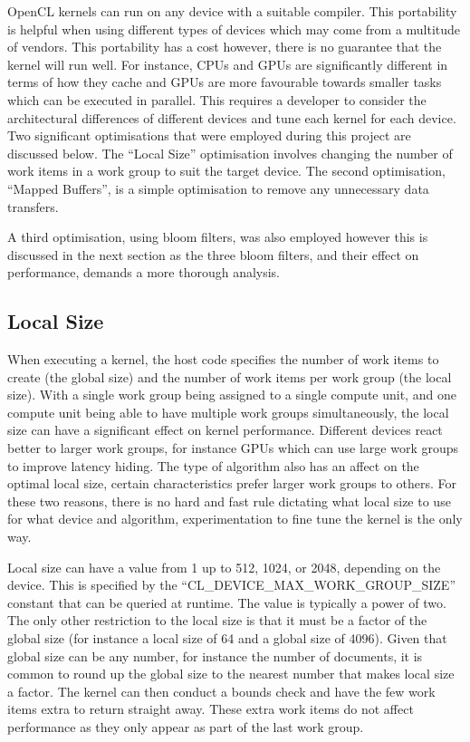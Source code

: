 OpenCL kernels can run on any device with a suitable compiler. This portability
is helpful when using different types of devices which may come from a multitude
of vendors. This portability has a cost however, there is no guarantee that the
kernel will run well. For instance, CPUs and GPUs are significantly different in
terms of how they cache and GPUs are more favourable towards smaller tasks which
can be executed in parallel. This requires a developer to consider the
architectural differences of different devices and tune each kernel for each
device. Two significant optimisations that were employed during this project are
discussed below. The ``Local Size'' optimisation involves changing the number of
work items in a work group to suit the target device. The second optimisation,
``Mapped Buffers'', is a simple optimisation to remove any unnecessary data
transfers.

A third optimisation, using bloom filters, was also employed however this is
discussed in the next section as the three bloom filters, and their effect on
performance, demands a more thorough analysis.

\subsection{Local Size}

When executing a kernel, the host code specifies the number of work items to
create (the global size) and the number of work items per work group (the local
size). With a single work group being assigned to a single compute unit, and one
compute unit being able to have multiple work groups simultaneously, the local
size can have a significant effect on kernel performance. Different devices
react better to larger work groups, for instance GPUs which can use large work
groups to improve latency hiding. The type of algorithm also has an affect on
the optimal local size, certain characteristics prefer larger work groups to
others. For these two reasons, there is no hard and fast rule dictating what
local size to use for what device and algorithm, experimentation to fine tune
the kernel is the only way.

Local size can have a value from 1 up to 512, 1024, or 2048, depending on the
device. This is specified by the ``CL\_DEVICE\_MAX\_WORK\_GROUP\_SIZE'' constant
that can be queried at runtime. The value is typically a power of two. The only
other restriction to the local size is that it must be a factor of the global
size (for instance a local size of 64 and a global size of 4096). Given that
global size can be any number, for instance the number of documents, it is
common to round up the global size to the nearest number that makes local size a
factor. The kernel can then conduct a bounds check and have the few work items
extra to return straight away. These extra work items do not affect performance
as they only appear as part of the last work group.

